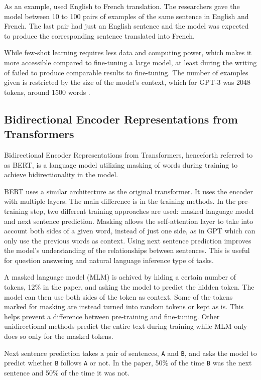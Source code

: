 \documentclass[twoside]{article}
\begin{document}
As an example, \cite{brown_language_2020} used English to French translation.
The researchers gave the model between 10 to 100 pairs of examples of the
same sentence in English and French. The last pair had just an English sentence
and the model was expected to produce the corresponding sentence translated into
French.

While few-shot learning requires less data and computing power, which makes it more
accessible compared to fine-tuning a large model, at least during the writing of 
\cite{brown_language_2020} failed to produce comparable results to fine-tuning.
The number of examples given is restricted by the size of the model's context,
which for GPT-3 was 2048 tokens, around 1500 words \cite{noauthor_pricing_nodate}.

\subsection{Bidirectional Encoder Representations from Transformers}
Bidirectional Encoder Representations from Transformers, henceforth referred to as BERT,
is a language model utilizing masking of words during training to achieve bidirectionality
in the model. \cite{devlin_bert_2019}

BERT uses a similar architecture as the original transformer. It uses the encoder with
multiple layers. The main difference is in the training methods. In the pre-training step,
two different training approaches are used: masked language model and next sentence prediction.
Masking allows the self-attention layer to take into account both sides of a given word, instead
of just one side, as in GPT which can only use the previous words as context. Using next sentence
prediction improves the model's understanding of the relationships between sentences. This is
useful for question answering and natural language inference type of tasks. \cite{devlin_bert_2019}

A masked language model (MLM) is achived by hiding a certain number of tokens, 12\% in the paper, and
asking the model to predict the hidden token. The model can then use both sides of the token as
context. Some of the tokens marked for masking are instead turned 
into random tokens or kept as is. This helps prevent a difference between pre-training and fine-tuning.
Other unidirectional methods predict the entire text during training while MLM only 
does so only for the masked tokens. \cite{devlin_bert_2019}

Next sentence prediction takes a pair of sentences, \texttt{A} and \texttt{B}, and asks the model
to predict whether \texttt{B} follows \texttt{A} or not. In the paper, 50\% of the time \texttt{B} 
was the next sentence and 50\% of the time it was not. \cite{devlin_bert_2019}
\end{document}
